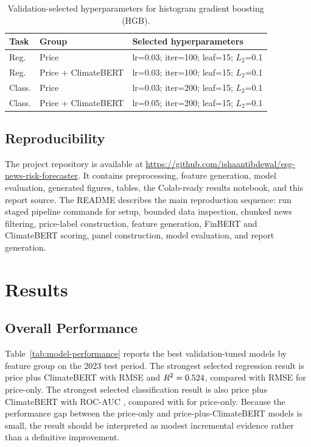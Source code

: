 \documentclass[sigconf,nonacm]{acmart}
\begin{document}
\begin{table}[t]
  \caption{Validation-selected hyperparameters for histogram gradient boosting (HGB).}
  \label{tab:hyperparams}
  \centering
  \scriptsize
  \setlength{\tabcolsep}{1.5pt}
  \begin{tabular}{@{}llp{}@{}}
    \toprule
    Task & Group & Selected hyperparameters \\
    \midrule
    Reg. & Price & lr=0.03; iter=100; leaf=15; $L_2$=0.1 \\
    Reg. & Price + ClimateBERT & lr=0.03; iter=100; leaf=15; $L_2$=0.1 \\
    Class. & Price & lr=0.03; iter=200; leaf=15; $L_2$=0.1 \\
    Class. & Price + ClimateBERT & lr=0.05; iter=200; leaf=15; $L_2$=0.1 \\
    \bottomrule
  \end{tabular}
\end{table}

\FloatBarrier
\subsection{Reproducibility}
The project repository is available at
\url{https://github.com/ishaantibdewal/esg-news-risk-forecaster}.
It contains preprocessing, feature generation, model evaluation, generated figures, tables, the Colab-ready results notebook, and this report source. The README describes the main reproduction sequence: run staged pipeline commands for setup, bounded data inspection, chunked news filtering, price-label construction, feature generation, FinBERT and ClimateBERT scoring, panel construction, model evaluation, and report generation.

\section{Results}
\subsection{Overall Performance}

\noindent Table~\ref{tab:model-performance} reports the best validation-tuned models by feature group on the 2023 test period. The strongest selected regression result is price plus ClimateBERT with RMSE \BestRegRMSE{} and $R^2=0.524{}$, compared with \PriceOnlyRMSE{} RMSE for price-only. The strongest selected classification result is also price plus ClimateBERT with ROC-AUC \BestClfAUC{}, compared with \PriceOnlyAUC{} for price-only. Because the performance gap between the price-only and price-plus-ClimateBERT models is small, the result should be interpreted as modest incremental evidence rather than a definitive improvement.
\end{document}
